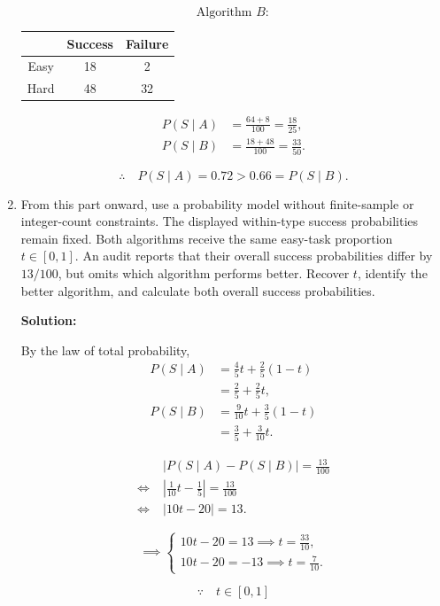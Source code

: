 \documentclass[11pt,a4paper]{article}
\begin{document}
\begin{enumerate}
\[
\text{Algorithm }B:
\]

\begin{center}
\begin{tabular}{c|cc}
\toprule
 & Success & Failure\\
\midrule
Easy & 18 & 2\\
Hard & 48 & 32\\
\bottomrule
\end{tabular}
\end{center}

\[
\begin{aligned}
P(S\mid A)&=\frac{64+8}{100}=\frac{18}{25},\\
P(S\mid B)&=\frac{18+48}{100}=\frac{33}{50}.
\end{aligned}
\]

\[
\therefore\quad
P(S\mid A)=0.72>0.66=P(S\mid B).
\]


\item From this part onward, use a probability model
without finite-sample or integer-count constraints.
The displayed within-type success probabilities remain
fixed. Both algorithms receive the same easy-task
proportion $t\in[0,1]$. An audit reports that their
overall success probabilities differ by $13/100$,
but omits which algorithm performs better.
Recover $t$, identify the better algorithm, and
calculate both overall success probabilities.

\textbf{Solution:}

By the law of total probability,
\[
\begin{aligned}
P(S\mid A)
&=\frac45t+\frac25(1-t)\\
&=\frac25+\frac25t,\\[6pt]
P(S\mid B)
&=\frac9{10}t+\frac35(1-t)\\
&=\frac35+\frac3{10}t.
\end{aligned}
\]

\[
\begin{aligned}
&|P(S\mid A)-P(S\mid B)|=\frac{13}{100}\\
\iff\;&
\left|\frac1{10}t-\frac15\right|
=\frac{13}{100}\\
\iff\;&
|10t-20|=13.
\end{aligned}
\]

\[
\implies
\begin{cases}
10t-20=13 \implies t=\frac{33}{10},\\
10t-20=-13 \implies t=\frac7{10}.
\end{cases}
\]

\[
\because\quad t\in[0,1]
\]


\end{enumerate}
\end{document}
